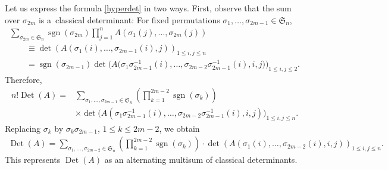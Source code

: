 \documentclass[pdftex]{sigma}
\numberwithin{equation}{section}
\def\sgn{\operatorname{sgn}}
\def\Det{\operatorname{Det}}
\def\frS{\mathfrak{S}}
\begin{document}
{\allowdisplaybreaks Let us express the formula \eqref{hyperdet} in two ways. First, observe that the sum over $\sigma_{2m}$ is a~classical determinant: For fixed permutations $\sigma_1,\dots,\sigma_{2m-1} \in \frS_n$,
\begin{gather*}
\sum_{\sigma_{2m} \in \frS_n} \sgn(\sigma_{2m}) \prod_{j=1}^n A(\sigma_1(j),\dots,\sigma_{2m}(j)) \\
\qquad\equiv \det(A(\sigma_1(i),\dots,\sigma_{2m-1}(i),j))_{1 \le i,j \le n} \\
\qquad= \sgn(\sigma_{2m-1}) \det\bigl(A\bigl(\sigma_1\sigma_{2m-1}^{-1}(i),\dots,\sigma_{2m-2}\sigma_{2m-1}^{-1}(i),i,j\bigr)\bigr)_{1 \le i,j \le 2}.
\end{gather*}
Therefore,
\begin{align*}
n! \Det(A) ={}& \sum_{\sigma_1,\dots,\sigma_{2m-1} \in \frS_n}
\left(\prod_{k=1}^{2m-2} \sgn(\sigma_k)\right)\\
&
\times \det\bigl(A(\sigma_1\sigma_{2m-1}^{-1}(i),\dots,\sigma_{2m-2}\sigma_{2m-1}^{-1}(i),i,j)\bigr)_{1 \le i,j \le n} .
\end{align*}
Replacing $\sigma_k$ by $\sigma_k \sigma_{2m-1}$, $1 \le k \le 2m-2$, we obtain
\begin{gather}
\Det(A)
= \sum_{\sigma_1,\dots,\sigma_{2m-2} \in \frS_n} \left(\prod_{k=1}^{2m-2} \sgn(\sigma_k)\right) \cdot \det(A(\sigma_1(i),\dots,\sigma_{2m-2}(i),i,j))_{1 \le i,j \le n}.\label{recurrencetwobytwo}
\end{gather}
This represents $\Det(A)$ as an alternating multisum of classical determinants.

}
\end{document}
